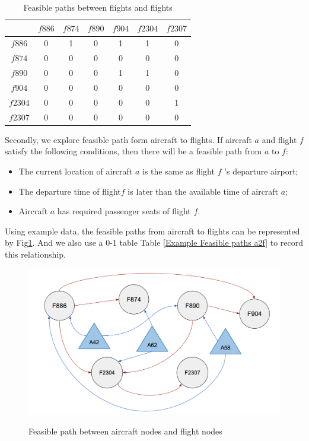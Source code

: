 \documentclass[senior]{IPSstyle}
\begin{document}
\begin{table}[h]
\renewcommand{\arraystretch}{1}
\caption{Feasible paths between flights and flights}
\label{Example Feasible paths f2f}
\begin{center}
\begin{tabular}{|c|c|c|c|c|c|c|}
\hline
\multicolumn{1}{|c|}{}
&\multicolumn{1}{|c|}{\(f886\)}
&\multicolumn{1}{c|}{\(f874\)}
&\multicolumn{1}{c|}{\(f890\)}
&\multicolumn{1}{c|}{\(f904\)}
&\multicolumn{1}{c|}{\(f2304\)}
&\multicolumn{1}{c|}{\(f2307\)}

\\  \hline
\(f886\) & 0 & 1 & 0 & 1 & 1 & 0
\\	\hline
\(f874\) & 0 & 0 & 0 & 0 & 0 & 0
\\	\hline
\(f890\) & 0 & 0 & 0 & 1 & 1 & 0
\\  \hline
\(f904\) & 0 & 0 & 0 & 0 & 0 & 0
\\  \hline
\(f2304\) & 0 & 0 & 0 & 0 & 0 & 1
\\  \hline
\(f2307\) & 0 & 0 & 0 & 0 & 0 & 0
\\  \hline
\end{tabular}
\end{center}
\end{table}

Secondly, we explore feasible path form aircraft to flights.
If aircraft \(a\) and flight \(f\) satisfy the following conditions, then there will be a feasible path from \(a\) to \(f\):
\begin{itemize}
    \item The current location of aircraft \(a\) is the same as flight \(f\) ’s departure airport;
    \item The departure time of flight\(f\) is later than the available time of aircraft \(a\);
    \item Aircraft \(a\) has required passenger seats of flight \(f\).
\end{itemize}
Using example data, the feasible paths from aircraft to flights can be represented by Fig\ref{fig:a2f}. And we also use a 0-1 table Table \ref{Example Feasible paths a2f} to record this relationship.

\begin{figure}[h]
    \centering
    \includegraphics[width=15cm]{MasterThesis-master/a2f.png}\\
    \caption{Feasible path between aircraft nodes and flight nodes}
    \label{fig:a2f}
\end{figure}
\end{document}
